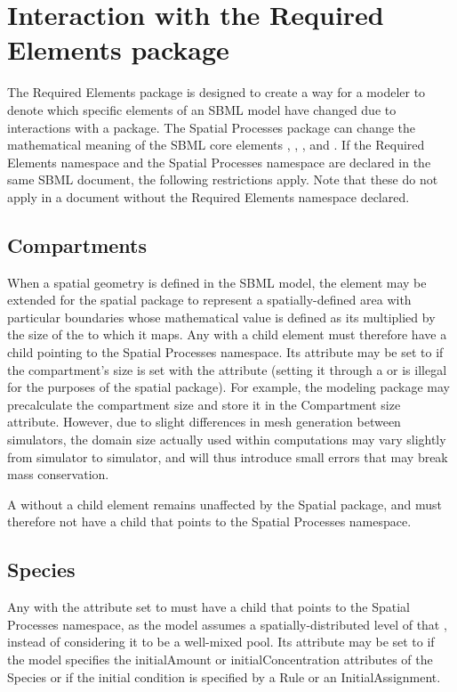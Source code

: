 
\section{Interaction with the Required Elements package}
\label{required-elements-interaction}

The Required Elements package is designed to create a way for a modeler to denote which specific elements of an SBML model have changed due to interactions with a package.  The Spatial Processes package can change the mathematical meaning of the SBML core elements \Compartment, \Species, \Reaction, and \Parameter.  If the Required Elements namespace and the Spatial Processes namespace are declared in the same SBML document, the following restrictions apply.  Note that these do not apply in a document without the Required Elements namespace declared.

\subsection{Compartments}
When a spatial geometry is defined in the SBML model, the \Compartment element may be extended for the spatial package to represent a spatially-defined area with particular boundaries whose mathematical value is defined as its  multiplied by the size of the \DomainType to which it maps.  Any \Compartment with a child \CompartmentMapping element must therefore have a \ChangedMath child pointing to the Spatial Processes namespace.  Its  attribute may be set to  if the compartment's size is set with the  attribute (setting it through a \Rule or \InitialAssignment is illegal for the purposes of the spatial package).  For example, the modeling package may precalculate the compartment size and store it in the Compartment size attribute.  However, due to slight differences in mesh generation between simulators, the domain size actually used within computations may vary slightly from simulator to simulator, and will thus introduce small errors that may break mass conservation.

A \Compartment without a child \CompartmentMapping element remains unaffected by the Spatial package, and must therefore not have a \ChangedMath child that points to the Spatial Processes namespace.

\subsection{Species}
Any \Species with the  attribute set to  must have a \ChangedMath child that points to the Spatial Processes namespace, as the model assumes a spatially-distributed level of that \Species, instead of considering it to be a well-mixed pool.  Its  attribute may be set to  if the model specifies the initialAmount or initialConcentration attributes of the Species or if the initial condition is specified by a Rule or an InitialAssignment.

